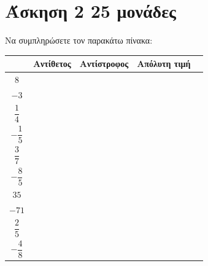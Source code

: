 \documentclass[a4paper,10pt]{report}
\begin{document}
\section*{Άσκηση 2  \hfill \small{25 μονάδες}}
Να συμπληρώσετε τον παρακάτω πίνακα: 
\begin{center}
 \begin{tabular}{|c|c|c|c|c|}
\hline                   
       & \textbf{Αντίθετος} &  \textbf{Αντίστροφος} & \textbf{Απόλυτη τιμή}   \\
\hline 
  $8$            &                        &                      &             \\
\hline 
  $-3$            &                        &                       &            \\
\hline 
  $\dfrac{1}{4}$             &                       &                       &    \\
\hline 
  $-\dfrac{1}{5}$             &                       &                       &         \\
\hline
  $\dfrac{3}{7}$          &                       &                       &          \\
\hline
  $-\dfrac{8}{5}$             &                       &                       &           \\
\hline
  $35$             &                       &                       &                 \\
\hline
  $-71$             &                       &                      &            \\
\hline
  $\dfrac{2}{5}$             &                       &                       &                    \\
\hline 
$-\dfrac{4}{8}$            &                       &                      &                     \\
\hline
\end{tabular}
\end{center}
\end{document}
